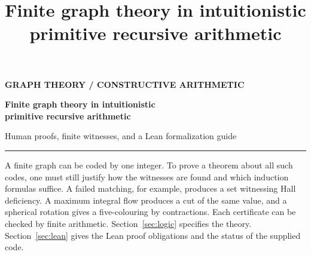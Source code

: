 \documentclass[11pt,letterpaper]{article}
\title{Finite graph theory in intuitionistic primitive recursive arithmetic}
\author{}\date{}
\theoremstyle{definition}\newtheorem{definition}[theorem]{Definition}
\begin{document}
\thispagestyle{plain}
{\sffamily\small\bfseries\color{linkcol} GRAPH THEORY \quad / \quad CONSTRUCTIVE ARITHMETIC}\par
\vspace{8pt}
{\color{ink}\LARGE\bfseries Finite graph theory in intuitionistic\\[3pt] primitive recursive arithmetic\par}
\vspace{6pt}
{\large Human proofs, finite witnesses, and a Lean formalization guide}\par
\vspace{8pt}\hrule\vspace{8pt}
A finite graph can be coded by one integer. To prove a theorem about all such
codes, one must still justify how the witnesses are found and which induction
formulas suffice. A failed matching, for example, produces a set witnessing
Hall deficiency. A maximum integral flow produces a cut of the same value,
and a spherical rotation gives a five-colouring by contractions. Each
certificate can be checked by finite arithmetic. Section~\ref{sec:logic}
specifies the theory. Section~\ref{sec:lean} gives the Lean proof obligations
and the status of the supplied code.
\tableofcontents
\clearpage













\end{document}
